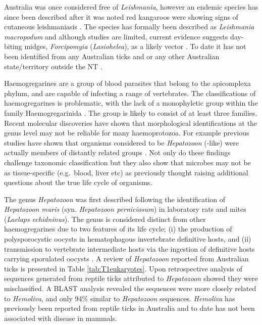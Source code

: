 \documentclass[a4paper, nobind]{templates/ociamthesis}
\begin{document}
Australia was once considered free of \emph{Leishmania}, however an endemic species has since been described after it was noted red kangaroos were showing signs of cutaneous leishmaniasis \autocite{roseCutaneousLeishmaniasisRed2004}.
The species has formally been described as \emph{Leishmania macropodum} \autocite{barrattIsolationNovelTrypanosomatid2017} and although studies are limited, current evidence suggests day-biting midges, \emph{Forcipomyia} (\emph{Lasiohelea}), as a likely vector \autocite{dougallEvidenceIncriminatingMidges2011,panahiUtilisingNovelSurveillance2020}.
To date it has not been identified from any Australian ticks and or any other Australian state/territory outside the NT \autocite{cleareRemainingVigilantExotic2014,dybingGhostsChristmasAbsence2016,thompsonExoticParasiteThreats2018}.

Haemogregarines are a group of blood parasites that belong to the apicomplexa phylum, and are capable of infecting a range of vertebrates.
The classifications of haemogregarines is problematic, with the lack of a monophyletic group within the family Haemogregarinida \autocite{al-quraishyHaemogregarinesCriteriaIdentification2021}. The group is likely to consist of at least three families.
Recent molecular discoveries have shown that morphological identifications at the genus level may not be reliable for many haemoprotozoa.
For example previous studies have shown that organisms considered to be \emph{Hepatozoon} (-like) were actually members of distantly related groups \autocite{merinoSarcocystidMisidentifiedHepatozoon2008,zhuLooksCanDeceive2009}.
Not only do these findings challenge taxonomic classification but they also show that microbes may not be as tissue-specific (e.g.~blood, liver etc) as previously thought raising additional questions about the true life cycle of organisms.

The genus \emph{Hepatozoon} was first described following the identification of \emph{Hepatozoon muris} (syn. \emph{Hepatozoon perniciosum}) in laboratory rats and mites (\emph{Laelaps echidninus}).
The genus is considered distinct from other haemogregarines due to two features of its life cycle; (i) the production of polysporocystic oocysts in hematophagous invertebrate definitive hosts, and (ii) transmission to vertebrate intermediate hosts via the ingestion of definitive hosts carrying sporulated oocysts \autocite{smithGenusHepatozoonApicomplexa1996,mathewPHYLOGENETICRELATIONSHIPSHEPATOZOON2000}.
A review of \emph{Hepatozoon} reported from Australian ticks is presented in Table \ref{tab:T1eukaryotes}.
Upon retrospective analysis of sequences generated from reptile ticks attributed to \emph{Hepatozoon} \autocite{vilcinsMolecularMorphologicalDescription2009} showed they were misclassified.
A BLAST analysis revealed the sequences were more closely related to \emph{Hemoliva}, and only 94\% similar to \emph{Hepatozoon} sequences.
\emph{Hemoliva} has previously been reported from reptile ticks in Australia and to date has not been associated with disease in mammals.
\end{document}
